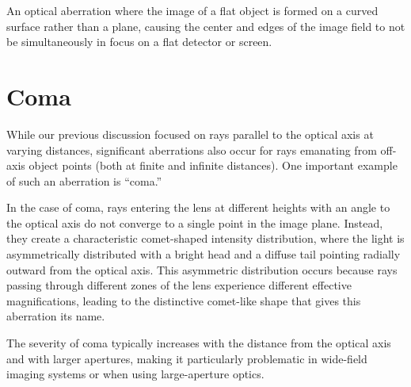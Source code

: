 \documentclass[
  a4paper,
]{book}
\begin{document}
\begin{tcolorbox}[enhanced jigsaw, breakable, toptitle=1mm, bottomrule=.15mm, colbacktitle=quarto-callout-note-color!10!white, title=\textcolor{quarto-callout-note-color}{\faInfo}\hspace{0.5em}{Field Curvature}, arc=.35mm, rightrule=.15mm, bottomtitle=1mm, opacityback=0, toprule=.15mm, coltitle=black, leftrule=.75mm, opacitybacktitle=0.6, colback=white, left=2mm, titlerule=0mm, colframe=quarto-callout-note-color-frame]

An optical aberration where the image of a flat object is formed on a
curved surface rather than a plane, causing the center and edges of the
image field to not be simultaneously in focus on a flat detector or
screen.

\end{tcolorbox}

\section{Coma}\label{coma}

While our previous discussion focused on rays parallel to the optical
axis at varying distances, significant aberrations also occur for rays
emanating from off-axis object points (both at finite and infinite
distances). One important example of such an aberration is ``coma.''

In the case of coma, rays entering the lens at different heights with an
angle to the optical axis do not converge to a single point in the image
plane. Instead, they create a characteristic comet-shaped intensity
distribution, where the light is asymmetrically distributed with a
bright head and a diffuse tail pointing radially outward from the
optical axis. This asymmetric distribution occurs because rays passing
through different zones of the lens experience different effective
magnifications, leading to the distinctive comet-like shape that gives
this aberration its name.

The severity of coma typically increases with the distance from the
optical axis and with larger apertures, making it particularly
problematic in wide-field imaging systems or when using large-aperture
optics.
\end{document}
